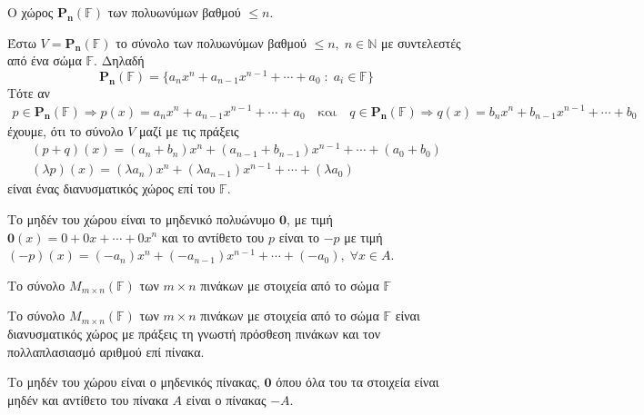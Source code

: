 \documentclass[a4paper,table]{report}
\begin{document}
\begin{example}
  \textcolor{Col2}{Ο χώρος $\mathbf{P_{n}(\mathbb{F})}$ των 
  πολυωνύμων βαθμού $ \leq n $}.

  Έστω $ V = \mathbf{P_{n}}(\mathbb{F}) $ το σύνολο των πολυωνύμων βαθμού 
  $ \leq n, \; n \in \mathbb{N}  $ με συντελεστές από ένα σώμα 
  $ \mathbb{F} $. Δηλαδή 
  \[
    \mathbf{P_{n}}(\mathbb{F}) = \{ a_{n}x^{n}+a_{n-1}x^{n-1}+\cdots +
    a_{0} \; : \; a_{i} \in \mathbb{F} \}  
  \]
  Τότε αν 
  \begin{gather*}
    p \in \mathbf{P_{n}}(\mathbb{F}) \Rightarrow p(x)
    = a_{n}x^{n}+a_{n-1}x^{n-1}+\cdots + a_{0} \quad \text{και} 
    \quad q \in \mathbf{P_{n}}(\mathbb{F}) \Rightarrow 
    q(x) = b_{n}x^{n}+b_{n-1}x^{n-1}+\cdots + b_{0} 
  \end{gather*} 
  έχουμε, ότι το σύνολο $ V $ μαζί με τις πράξεις 
  \begin{gather*}
    (p+q)(x) = (a_{n}+ b_{n})x^{n} + 
    (a_{n-1}+b_{n-1})x^{n-1}+ \cdots + (a_{0}+ b_{0}) \\
    (\lambda p)(x) = (\lambda a_{n})x^{n}+
    ( \lambda a_{n-1})x^{n-1}+ \cdots + ( \lambda a_{0})
  \end{gather*} 
  είναι ένας διανυσματικός χώρος επί του $ \mathbb{F} $.

  Το μηδέν του χώρου είναι το μηδενικό πολυώνυμο $ \mathbf{0} $, 
  με τιμή $ \mathbf{0}(x)=0+0x+\cdots +0x^{n} $ και το αντίθετο του 
  $p$ είναι το $ - p $ με τιμή $ (- p)(x) = 
  (-a_{n})x^{n}+(-a_{n-1})x^{n-1}+\cdots + (-a_{0}), \; \forall x \in A $.  
\end{example}

\begin{example}\label{ex:mat} 
  \textcolor{Col2}{Το σύνολο $ M_{m \times n}(\mathbb{F}) $ 
  των $ m \times n $ πινάκων με στοιχεία από το σώμα $ \mathbb{F} $}

  Το σύνολο $ M_{m \times n}(\mathbb{F}) $ των $ m \times n $ πινάκων 
  με στοιχεία από το σώμα $ \mathbb{F} $ είναι διανυσματικός χώρος 
  με πράξεις τη γνωστή πρόσθεση πινάκων και τον πολλαπλασιασμό 
  αριθμού επί πίνακα.

  Το μηδέν του χώρου είναι ο μηδενικός πίνακας, $ \mathbf{0} $ όπου 
  όλα του τα στοιχεία είναι μηδέν και αντίθετο του πίνακα $A$ είναι 
  ο πίνακας $ -A $.
\end{example}
\end{document}

